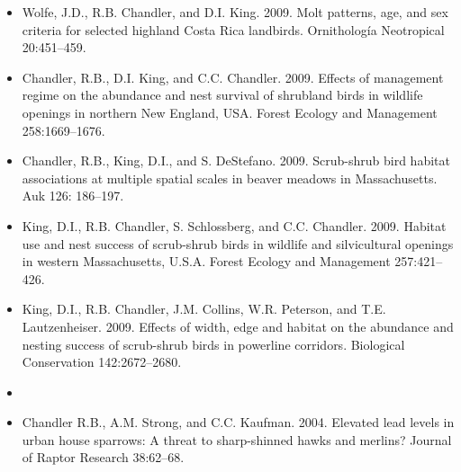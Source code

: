 \documentclass[12pt]{article}
\begin{document}
\begin{itemize}
\item Wolfe, J.D., R.B. Chandler, and D.I. King. 2009. Molt
  patterns, age, and sex criteria for selected highland Costa Rica
  landbirds. Ornitholog\'{i}a Neotropical 20:451--459.

\item Chandler, R.B., D.I. King, and C.C. Chandler. 2009. Effects
  of management regime on the abundance and nest survival of shrubland
  birds in wildlife openings in northern New England, USA. Forest
  Ecology and Management 258:1669--1676.

\item Chandler, R.B., King, D.I., and
  S. DeStefano. 2009. Scrub-shrub bird habitat associations at
  multiple spatial scales in beaver meadows in Massachusetts. Auk 126:
  186--197.

\item King, D.I., R.B. Chandler, S. Schlossberg, and
  C.C. Chandler. 2009. Habitat use and nest success of scrub-shrub
  birds in wildlife and silvicultural openings in western
  Massachusetts, U.S.A. Forest Ecology and Management 257:421--426.

\item King, D.I., R.B. Chandler, J.M. Collins, W.R. Peterson, and
  T.E. Lautzenheiser. 2009. Effects of width, edge and habitat on the
  abundance and nesting success of scrub-shrub birds in powerline
  corridors. Biological Conservation 142:2672--2680.

\item[] { \\}

\item Chandler R.B., A.M. Strong, and C.C. Kaufman. 2004. Elevated
  lead levels in urban house sparrows: A threat to sharp-shinned hawks
  and merlins? Journal of Raptor Research 38:62--68.

\end{itemize}








\begin{comment}
\emph{Technical Reports}
\begin{itemize}
  \item Chandler, R.B., D.I. King, and C.C. Chandler. 2006. Butterfly
    occurrence and species richness in wildlife openings and clearcuts
    on the White Mountain National Forest. A Report to the Wildlife TES
    Program, White Mountain National Forest.
\end{itemize}
\end{comment}
\end{document}
